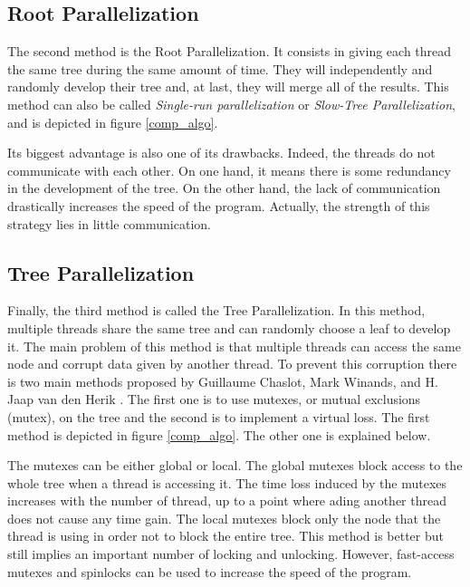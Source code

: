 \subsection{Root Parallelization}
\label{sec:root}

The second method is the Root Parallelization. It consists in giving each thread the same tree during the same amount of time. They will independently and randomly develop their tree and, at last, they will merge all of the results. This method can also be called \emph{Single-run parallelization} or \emph{Slow-Tree Parallelization}, and is depicted in figure \ref{comp_algo}.
\newline

Its biggest advantage is also one of its drawbacks. Indeed, the threads do not communicate with each other. On one hand, it means there is some redundancy in the development of the tree. On the other hand, the lack of communication drastically increases the speed of the program. Actually, the strength of this strategy lies in little communication.

\subsection{Tree Parallelization}
\label{sec:tree}

Finally, the third method is called the Tree Parallelization. In this method, multiple threads share the same tree and can randomly choose a leaf to develop it. The main problem of this method is that multiple threads can access the same node and corrupt data given by another thread. To prevent this corruption there is two main methods proposed by Guillaume Chaslot, Mark Winands, and H. Jaap van den Herik \cite{parallel_comp}. The first one is to use mutexes, or mutual exclusions (mutex), on the tree and the second is to implement a virtual loss. The first method is depicted in figure \ref{comp_algo}. The other one is explained below.
\newline

The mutexes can be either global or local. The global mutexes block access to the whole tree when a thread is accessing it. The time loss induced by the mutexes increases with the number of thread, up to a point where ading another thread does not cause any time gain. The local mutexes block only the node that the thread is using in order not to block the entire tree. This method is better but still implies an important number of locking and unlocking. However, fast-access mutexes and spinlocks can be used to increase the speed of the program.
\newline

